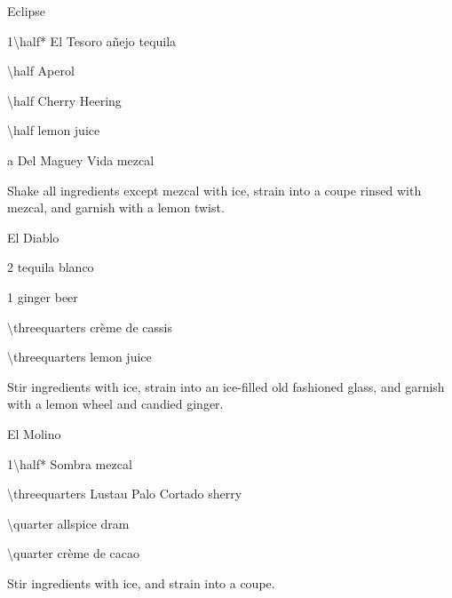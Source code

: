\begin{PDTCocktail}{Eclipse}
	\begin{Ingredients}
	\item \SI{1\half*}{\oz} El Tesoro a\~nejo tequila
	\item \SI{\half}{\oz} Aperol
	\item \SI{\half}{\oz} Cherry Heering
	\item \SI{\half}{\oz} lemon juice
	\item a \si{\dash} Del Maguey Vida mezcal
	\end{Ingredients}
	
	\begin{Instructions}
	Shake all ingredients except mezcal with ice, strain into a coupe rinsed with mezcal, and garnish with a lemon twist.
	\end{Instructions}
\end{PDTCocktail}

\begin{PDTCocktail}{El Diablo}
	\begin{Ingredients}
	\item \SI{2}{\oz} tequila blanco
	\item \SI{1}{\oz} ginger beer
	\item \SI{\threequarters}{\oz} cr\`eme de cassis
	\item \SI{\threequarters}{\oz} lemon juice
	\end{Ingredients}
	
	\begin{Instructions}
	Stir ingredients with ice, strain into an ice-filled old fashioned glass, and garnish with a lemon wheel and candied ginger.
	\end{Instructions}
\end{PDTCocktail}

\begin{PDTCocktail}{El Molino}
	\begin{Ingredients}
	\item \SI{1\half*}{\oz} Sombra mezcal
	\item \SI{\threequarters}{\oz} Lustau Palo Cortado sherry
	\item \SI{\quarter}{\oz} allspice dram
	\item \SI{\quarter}{\oz} cr\`eme de cacao
	\end{Ingredients}
	
	\begin{Instructions}
	Stir ingredients with ice, and strain into a coupe.
	\end{Instructions}
\end{PDTCocktail}

